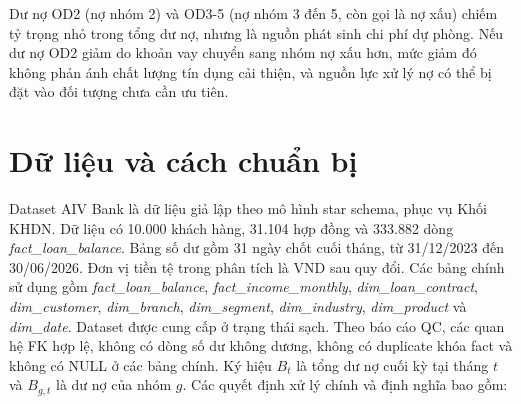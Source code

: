 \documentclass[12pt]{eDA_conquer2026}
\begin{document}
\vspace{0.2cm}
Dư nợ OD2 (nợ nhóm 2) và OD3-5 (nợ nhóm 3 đến 5, còn gọi là nợ xấu) chiếm tỷ trọng nhỏ trong tổng dư nợ, nhưng là nguồn phát sinh chi phí dự phòng. Nếu dư nợ OD2 giảm do khoản vay chuyển sang nhóm nợ xấu hơn, mức giảm đó không phản ánh chất lượng tín dụng cải thiện, và nguồn lực xử lý nợ có thể bị đặt vào đối tượng chưa cần ưu tiên.

\section{Dữ liệu và cách chuẩn bị}

Dataset AIV Bank là dữ liệu giả lập theo mô hình star schema, phục vụ Khối KHDN. Dữ liệu có 10.000 khách hàng, 31.104 hợp đồng và 333.882 dòng \textit{fact\_loan\_balance}. Bảng số dư gồm 31 ngày chốt cuối tháng, từ 31/12/2023 đến 30/06/2026. Đơn vị tiền tệ trong phân tích là VND sau quy đổi. Các bảng chính sử dụng gồm \textit{fact\_loan\_balance}, \textit{fact\_income\_monthly}, \textit{dim\_loan\_contract}, \textit{dim\_customer}, \textit{dim\_branch}, \textit{dim\_segment}, \textit{dim\_industry}, \textit{dim\_product} và \textit{dim\_date}. Dataset được cung cấp ở trạng thái sạch. Theo báo cáo QC, các quan hệ FK hợp lệ, không có dòng số dư không dương, không có duplicate khóa fact và không có NULL ở các bảng chính. Ký hiệu $B_t$ là tổng dư nợ cuối kỳ tại tháng $t$ và $B_{g,t}$ là dư nợ của nhóm $g$. Các quyết định xử lý chính và định nghĩa bao gồm:
\end{document}
